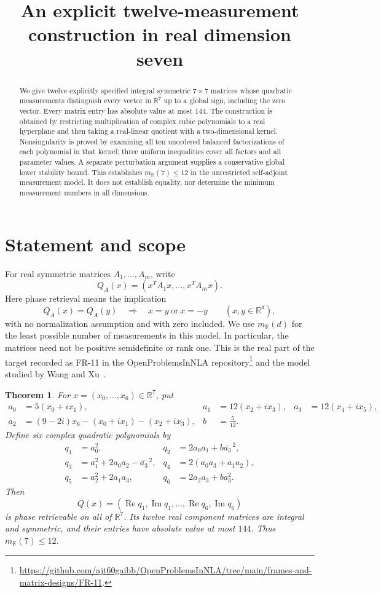 \documentclass[11pt]{article}
\title{An explicit twelve-measurement construction in real dimension seven}
\author{}\date{}
\newtheorem{theorem}{Theorem}
\theoremstyle{remark}\newtheorem{remark}[theorem]{Remark}
\newcommand{\R}{\mathbb R}\newcommand{\C}{\mathbb C}
\newcommand{\im}{\operatorname{Im}}\newcommand{\re}{\operatorname{Re}}
\begin{document}
\maketitle
\begin{abstract}
We give twelve explicitly specified integral symmetric $7\times7$ matrices whose quadratic measurements distinguish every vector in $\R^7$ up to a global sign, including the zero vector. Every matrix entry has absolute value at most $144$. The construction is obtained by restricting multiplication of complex cubic polynomials to a real hyperplane and then taking a real-linear quotient with a two-dimensional kernel. Nonsingularity is proved by examining all ten unordered balanced factorizations of each polynomial in that kernel; three uniform inequalities cover all factors and all parameter values. A separate perturbation argument supplies a conservative global lower stability bound. This establishes $m_{\R}(7)\le12$ in the unrestricted self-adjoint measurement model. It does not establish equality, nor determine the minimum measurement numbers in all dimensions.
\end{abstract}

\section{Statement and scope}
For real symmetric matrices $A_1,\ldots,A_m$, write
\[
 Q_A(x)=(x^T A_1x,\ldots,x^T A_mx).
\]
Here phase retrieval means the implication
\[
 Q_A(x)=Q_A(y)\quad\Longrightarrow\quad x=y\ \text{or}\ x=-y
 \qquad (x,y\in\R^d),
\]
with no normalization assumption and with zero included. We use $m_{\R}(d)$ for the least possible number of measurements in this model. In particular, the matrices need not be positive semidefinite or rank one. This is the real part of the target recorded as FR-11 in the OpenProblemsInNLA repository\footnote{\url{https://github.com/ajt60gaibb/OpenProblemsInNLA/tree/main/frames-and-matrix-designs/FR-11}.} and the model studied by Wang and Xu~\cite{WX}.

\begin{theorem}\label{thm:main}
For $x=(x_0,\ldots,x_6)\in\R^7$, put
\begin{align*}
 a_0&=5(x_0+i x_1), & a_1&=12(x_2+i x_3), & a_3&=12(x_4+i x_5),\\
 a_2&=(9-2i)x_6-(x_0+i x_1)-(x_2+i x_3), & b&=\frac5{12}.
\end{align*}
Define six complex quadratic polynomials by
\begin{align}
 q_1&=a_0^2, & q_2&=2a_0a_1+b\overline{a_3}^{\,2},\nonumber\\
 q_3&=a_1^2+2a_0a_2-\overline{a_3}^{\,2}, &
 q_4&=2(a_0a_3+a_1a_2),\label{eq:quadratics}\\
 q_5&=a_2^2+2a_1a_3, & q_6&=2a_2a_3+b a_3^2.\nonumber
\end{align}
Then
\[
 Q(x)=(\re q_1,\im q_1,\ldots,\re q_6,\im q_6)
\]
is phase retrievable on all of $\R^7$. Its twelve real component matrices are integral and symmetric, and their entries have absolute value at most $144$. Thus $m_{\R}(7)\le12$.
\end{theorem}
\end{document}
